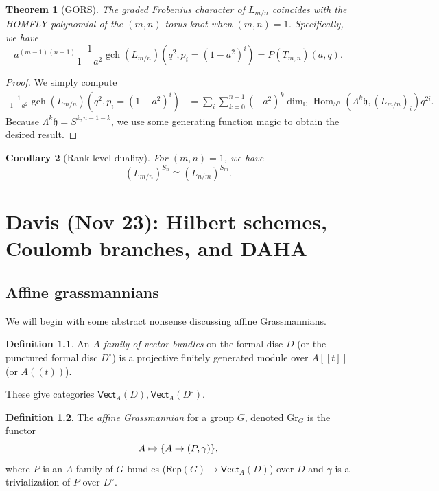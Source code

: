 \documentclass[leqno, openany]{memoir}
\newtheorem{thm}{Theorem}[section]
\newtheorem{cor}[thm]{Corollary}
\theoremstyle{definition}
\newtheorem{defn}[thm]{Definition}
\theoremstyle{remark}
\theoremstyle{plain}
\theoremstyle{definition}
\theoremstyle{remark}
\newcommand{\C}{\mathbb{C}}
\newcommand{\h}{\mathfrak{h}}
\newcommand{\mr}[1]{\mathrm{#1}}
\newcommand{\ms}[1]{\mathsf{#1}}
\newcommand{\on}[1]{\operatorname{#1}}
\newcommand{\1}{\mathbf{1}}
\newcommand{\2}{\mathbf{2}}
\newcommand{\3}{\mathbf{3}}
\DeclareMathOperator{\Hom}{Hom}
\begin{document}
\begin{thm}[GORS]
    The graded Frobenius character of $L_{m/n}$ coincides with the HOMFLY polynomial of the $(m,n)$ torus knot when $(m,n) = 1$. Specifically, we have
    \[ a^{(m-1)(n-1)} \frac{1}{1-a^2} \on{gch}(L_{m/n})(q^2, p_i = (1-a^2)^i) = P(T_{m,n})(a,q). \]
\end{thm}

\begin{proof}
    We simply compute
    \begin{align*}
        \frac{1}{1-a^2} \on{gch}(L_{m/n})(q^2, p_i = (1-a^2)^i) &= \sum_i \sum_{k=0}^{n-1} (-a^2)^k \dim_{\C} \Hom_{S^n}(\Lambda^k \h, (L_{m/n})_i) q^{2i}.
    \end{align*}
    Because $\Lambda^k \h = S^{k,n-1-k}$, we use some generating function magic to obtain the desired result.
\end{proof}

\begin{cor}[Rank-level duality]
    For $(m,n) = 1$, we have
    \[ (L_{m/n})^{S_n} \cong (L_{n/m})^{S_m}. \]
\end{cor}

\chapter{Davis (Nov 23): Hilbert schemes, Coulomb branches, and DAHA}%
\label{cha:davis_nov_23_hilbert_schemes_coulomb_branches_and_daha}

\section{Affine grassmannians}%
\label{sec:affine_grassmannians}

We will begin with some abstract nonsense discussing affine Grassmannians.

\begin{defn}
    An \textit{$A$-family of vector bundles} on the formal disc $D$ (or the punctured formal disc $D^{\circ}$) is a projective finitely generated module over $A[[t]]$ (or $A((t))$).
\end{defn}

These give categories $\ms{Vect}_A(D), \ms{Vect}_A(D^{\circ})$.

\begin{defn}
    The \textit{affine Grassmannian} for a group $G$, denoted $\mr{Gr}_G$ is the functor
    \[ A \mapsto \qty{A \to (P, \gamma)}, \]
    where $P$ is an $A$-family of $G$-bundles ($\ms{Rep}(G) \to \ms{Vect}_A(D)$) over $D$ and $\gamma$ is a trivialization of $P$ over $D^{\circ}$.
\end{defn}
\end{document}
